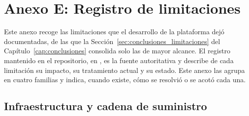 \chapter*{Anexo E: Registro de limitaciones}
\label{cap:anexo_limitaciones}

\setcounter{section}{0}
\renewcommand{\thesection}{E.\arabic{section}}

Este anexo recoge las limitaciones que el desarrollo de la plataforma dejó
documentadas, de las que la Sección~\ref{sec:conclusiones_limitaciones} del
Capítulo~\ref{cap:conclusiones} consolida solo las de mayor alcance. El
registro mantenido en el repositorio, en
, es la fuente autoritativa y
describe de cada limitación su impacto, su tratamiento actual y su estado.
Este anexo las agrupa en cuatro familias y indica, cuando existe, cómo se
resolvió o se acotó cada una.

\section{Infraestructura y cadena de suministro}
\label{sec:anexo_limitaciones_infra}

